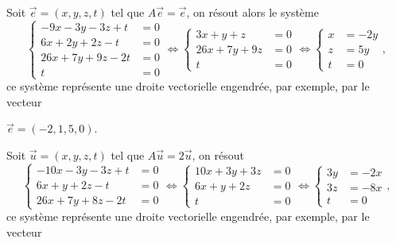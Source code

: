 {\begin{enumerate}
{Soit $\vec e=(x,y,z,t)$ tel que $A\vec e=\vec e$, on r\'esout alors le syst\`eme 
$$\left\{{\begin{aligned}-9x-3y-3z+t&=0 \\ 6x+2y+2z-t&=0 \\ 26x+7y+9z-2t&=0 \\  t&=0\end{aligned}}\right.\iff
\left\{{\begin{aligned}3x+y+z&=0 \\ 26x+7y+9z&=0 \\  t&=0\end{aligned}}\right.\iff
\left\{{\begin{aligned}x&=-2y \\  z&=5y \\  t&=0\end{aligned}}\right.,$$
ce syst\`eme repr\'esente une droite vectorielle engendr\'ee, par exemple, par le vecteur 

$\vec e=(-2,1,5,0)$.

Soit $\vec u=(x,y,z,t)$ tel que $A\vec u=2\vec u$, on r\'esout 
$$\left\{{\begin{aligned}-10x-3y-3z+t&=0 \\ 6x+y+2z-t&=0 \\ 26x+7y+8z-2t&=0\end{aligned}}\right.\iff
\left\{{\begin{aligned}10x+3y+3z&=0 \\ 6x+y+2z&=0 \\  t&=0\end{aligned}}\right.\iff
\left\{{\begin{aligned}3y&=-2x \\  3z&=-8x \\  t&=0\end{aligned}}\right.,$$
ce syst\`eme repr\'esente une droite vectorielle engendr\'ee, par exemple, par le vecteur

}
\end{enumerate}}
